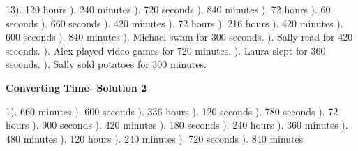 \documentclass{article}%
\begin{document}
13). 120 hours%
). 240 minutes%
). 720 seconds%
). 840 minutes%
). 72 hours%
). 60 seconds%
). 660 seconds%
). 420 minutes%
). 72 hours%
). 216 hours%
). 420 minutes%
). 600 seconds%
). 840 minutes%
). Michael swam for 300 seconds.%
). Sally read for 420 seconds.%
). Alex played video games for 720 minutes.%
). Laura slept for 360 seconds.%
). Sally sold potatoes for 300 minutes.%
\newline%
\newpage%
\large%
\begin{center}%
\textbf{Converting Time- Solution 2}%
\newline%
\end{center} \normalsize%
1). 660 minutes%
). 600 seconds%
). 336 hours%
). 120 seconds%
). 780 seconds%
). 72 hours%
). 900 seconds%
). 420 minutes%
). 180 seconds%
). 240 hours%
). 360 minutes%
). 480 minutes%
). 120 hours%
). 240 minutes%
). 720 seconds%
). 840 minutes%
\newline%
\end{document}
